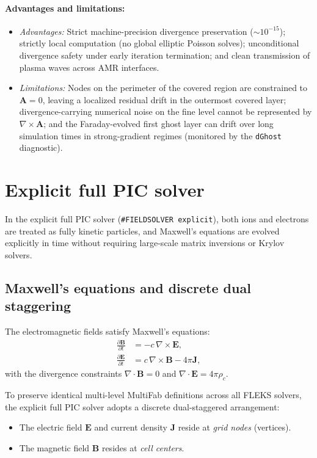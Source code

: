 \documentclass[a4paper, 11pt]{article}
\begin{document}
\paragraph{Advantages and limitations:}
\begin{itemize}
  \item \emph{Advantages:} Strict machine-precision divergence preservation ($\sim 10^{-15}$); strictly local computation (no global elliptic Poisson solves); unconditional divergence safety under early iteration termination; and clean transmission of plasma waves across AMR interfaces.
  \item \emph{Limitations:} Nodes on the perimeter of the covered region are constrained to $\mathbf{A} = 0$, leaving a localized residual drift in the outermost covered layer; divergence-carrying numerical noise on the fine level cannot be represented by $\nabla \times \mathbf{A}$; and the Faraday-evolved first ghost layer can drift over long simulation times in strong-gradient regimes (monitored by the \texttt{dGhost} diagnostic).
\end{itemize}

\section{Explicit full PIC solver}

In the explicit full PIC solver (\texttt{\#FIELDSOLVER explicit}), both ions and electrons are treated as fully kinetic particles, and Maxwell's equations are evolved explicitly in time without requiring large-scale matrix inversions or Krylov solvers.

\subsection{Maxwell's equations and discrete dual staggering}

The electromagnetic fields satisfy Maxwell's equations:
\begin{align}
\frac{\partial \mathbf{B}}{\partial t} &= -c\,\nabla \times \mathbf{E}, \label{eq:faraday_explicit} \\
\frac{\partial \mathbf{E}}{\partial t} &= c\,\nabla \times \mathbf{B} - 4\pi \mathbf{J}, \label{eq:ampere_explicit}
\end{align}
with the divergence constraints $\nabla \cdot \mathbf{B} = 0$ and $\nabla \cdot \mathbf{E} = 4\pi \rho_c$.

To preserve identical multi-level MultiFab definitions across all FLEKS solvers, the explicit full PIC solver adopts a discrete dual-staggered arrangement:
\begin{itemize}
  \item The electric field $\mathbf{E}$ and current density $\mathbf{J}$ reside at \emph{grid nodes} (vertices).
  \item The magnetic field $\mathbf{B}$ resides at \emph{cell centers}.
\end{itemize}
\end{document}
